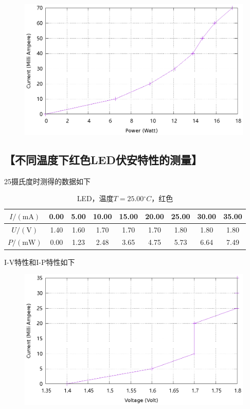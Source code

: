 \documentclass{ctexart}
\newcommand{\si}[1]{\mathrm{#1}}
\let\oldsubsection\subsection
\renewcommand{\subsection}[1]{\oldsubsection{\!\!\!\!\!\!【#1】}}
\begin{document}
\begin{figure}[H]
  \centering
  \includegraphics[width=0.8\linewidth]{optics-figures/led-pc-4.gnuplot}
\end{figure}

\subsection{不同温度下红色LED伏安特性的测量}

25摄氏度时测得的数据如下

\begin{table}[H]
  \centering
  \begin{tabular}{|c|c|c|c|c|c|c|c|c|}
    \hline
    $I/(\si{mA})$   & 0.00 & 5.00 & 10.00 & 15.00 & 20.00 & 25.00 & 30.00 & 35.00 \\\hline
    $U / (\si{V})$  & 1.40 & 1.60 & 1.70 & 1.70 & 1.70 & 1.80 & 1.80 & 1.80 \\\hline
    $P / (\si{mW})$ & 0.00 & 1.23 & 2.48 & 3.65 & 4.75 & 5.73 & 6.64 & 7.49 \\\hline
  \end{tabular}
  \caption{LED，温度$T=25.00{}^{\circ}C$，红色}
\end{table}

I-V特性和I-P特性如下

\begin{figure}[H]
  \centering
  \includegraphics[width=0.8\linewidth]{optics-figures/led-vc-1.gnuplot}
\end{figure}
\end{document}
